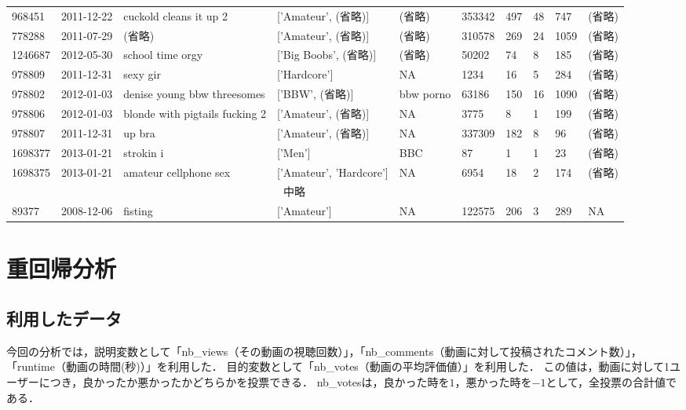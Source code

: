 \documentclass[uplatex]{jsarticle}
\begin{document}
\begin{landscape}
\begin{table}[htb]
\begin{center}
\begin{tabular}{llllllllll}
    968451 & 2011-12-22 & cuckold cleans it up 2 & ['Amateur', (省略)] & (省略) & 353342 & 497 & 48 & 747 & (省略) \\
    778288 & 2011-07-29 & (省略) & ['Amateur', (省略)] & (省略) & 310578 & 269 & 24 & 1059 & (省略) \\
    1246687 & 2012-05-30 & school time orgy & ['Big Boobs', (省略)] & (省略) & 50202 & 74 & 8 & 185 & (省略) \\
    978809 & 2011-12-31 & sexy gir & ['Hardcore'] & NA & 1234 & 16 & 5 & 284 & (省略) \\
    978802 & 2012-01-03 & denise young bbw threesomes & ['BBW', (省略)] & bbw porno & 63186 & 150 & 16 & 1090 & (省略) \\
    978806 & 2012-01-03 & blonde with pigtails fucking 2 & ['Amateur', (省略)] & NA & 3775 & 8 & 1 & 199 & (省略) \\
    978807 & 2011-12-31 & up bra & ['Amateur', (省略)] & NA & 337309 & 182 & 8 & 96 & (省略) \\
    1698377 & 2013-01-21 & strokin i & ['Men'] & BBC  & 87 & 1 & 1 & 23 & (省略) \\
    1698375 & 2013-01-21 & amateur cellphone sex & ['Amateur', 'Hardcore'] & NA & 6954 & 18 & 2 & 174 & (省略) \\

    \multicolumn{9}{c}{中略} \\
    89377 & 2008-12-06 & fisting & ['Amateur'] & NA & 122575 & 206 & 3 & 289 & NA \\
    \hline
    \end{tabular}
\label{tab:dataset}
\end{center}
\end{table}
\end{landscape}


\section{重回帰分析}

\subsection{利用したデータ}

今回の分析では，説明変数として「nb\_views（その動画の視聴回数）」，「nb\_comments（動画に対して投稿されたコメント数）」，「runtime（動画の時間(秒)）」を利用した．
目的変数として「nb\_votes（動画の平均評価値）」を利用した．
この値は，動画に対して1ユーザーにつき，良かったか悪かったかどちらかを投票できる．
nb\_votesは，良かった時を$1$，悪かった時を$-1$として，全投票の合計値である．
\end{document}
